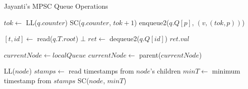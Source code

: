 \begin{algorithm}[!ht]
    \centering
    \captionsetup{justification=centering}
    \caption{Jayanti's \ac{MPSC} Queue Operations \cite{JayantiLog}}
    \label{alg:jayanti-mpsc}
    \scriptsize
    \begin{algorithmic}[1]
            \State $tok \gets$ LL($q.counter$) 
            \State SC($q.counter$, $tok + 1$) 
            \State enqueue2($q.Q[p]$, $(v, (tok, p))$) 
            \State {}
        \EndFunction
        
        \State
        
            \State $[t, id] \gets$ read($q.T.root$) 
                \State \Return $\bot$
            \EndIf
            \State $ret \gets$ dequeue2($q.Q[id]$)
            \State {}
            \State \Return $ret.val$
        \EndFunction
        
        \State
        
            \State $currentNode \gets localQueue$
            \Repeat
                \State $currentNode \gets$ parent($currentNode$)
                 
                    \State {} 
                \EndIf
        \EndFunction
        
        \State
        
            \State LL($node$) 
            \State $stamps \gets$ read timestamps from $node$'s children
            \State $minT \gets$ minimum timestamp from $stamps$
            \State \Return SC($node$, $minT$) 
        \EndFunction
    \end{algorithmic}
\end{algorithm}

